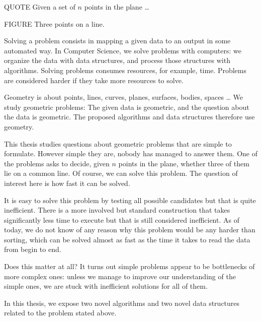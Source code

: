 

QUOTE Given a set of \(n\) points in the plane \dots

FIGURE Three points on a line.

Solving a problem consists in mapping a given data to an output in some
automated way.
In Computer Science, we solve problems with computers: we organize the data
with data structures, and process those structures with algorithms.
%
Solving problems consumes resources, for example, time.
Problems are considered harder if they take more resources to solve.

Geometry is about points, lines, curves, planes, surfaces, bodies, spaces \dots
We study geometric problems:
%
The given data is geometric, and the question about the data is geometric.
The proposed algorithms and data structures therefore use geometry.

This thesis studies questions about geometric problems that are simple to
formulate. However simple they are, nobody
has managed to answer them. One of the problems asks to decide, given \(n\) points in the plane,
whether three of them lie on a common line. Of course, we can solve this
problem. The question of interest here is how fast it can be solved.

It is easy to solve this problem by testing all possible candidates but that is
quite inefficient. There is a
more involved but standard construction that takes significantly less time to
execute but that is still considered inefficient. As of today, we do not know of
any reason why this problem would be any harder than sorting, which can be
solved almost as fast as the time it takes to read the data from begin to end.

Does this matter at all? It turns out simple problems appear to
be bottlenecks of more complex ones: unless we manage to improve our
understanding of the simple ones, we are stuck with inefficient solutions for
all of them.

In this thesis, we expose two novel algorithms and two novel data
structures related to the problem stated above.
